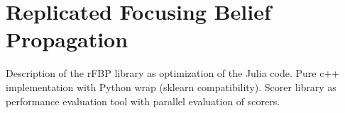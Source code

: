 \documentclass{standalone}
\begin{document}
\section[rFBP]{Replicated Focusing Belief Propagation}\label{rfbp}

Description of the rFBP library as optimization of the Julia code.
Pure c++ implementation with Python wrap (sklearn compatibility).
Scorer library as performance evaluation tool with parallel evaluation of scorers.
\end{document}
